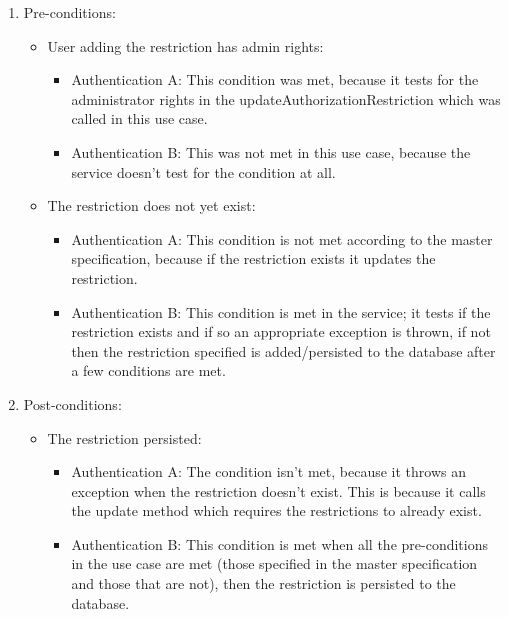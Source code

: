 \begin{enumerate}
	\item Pre-conditions:
	
	\begin{itemize}
		\item User adding the restriction has admin rights:
		\begin{itemize}
				\item Authentication A: This condition was met, because it tests for the administrator rights in the updateAuthorizationRestriction which was called in this use case.
				\item Authentication B: This was not met in this use case, because the service doesn't test for the condition at all.
		\end{itemize}
		\item The restriction does not yet exist:
		\begin{itemize}
				\item Authentication A: This condition is not met according to the master specification, because if the restriction exists it updates the restriction. 
				\item Authentication B: This condition is met in the service; it tests if the restriction exists and if so an appropriate exception is thrown, if not then the restriction specified is added/persisted to the database after a few conditions are met.
		\end{itemize}
	\end{itemize}

	\item Post-conditions:
	\begin{itemize}
		\item The restriction persisted:
			\begin{itemize}
			\item Authentication A: The condition isn't met, because it throws an exception when the restriction doesn't exist. This is because it calls the update method which requires the restrictions to already exist.
			\item Authentication B: This condition is met when all the pre-conditions in the use case are met (those specified in the master specification and those that are not), then the restriction is persisted to the database.				
			\end{itemize}
			
	\end{itemize}
		
\end{enumerate}
\medskip


